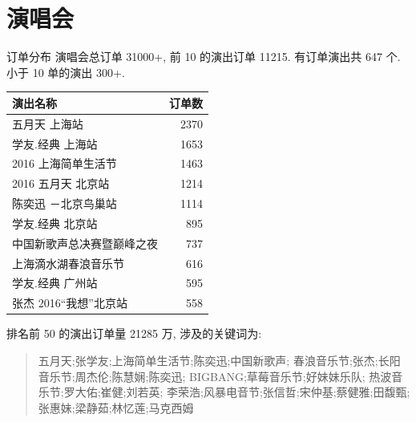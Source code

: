\documentclass[presentation, bigger]{beamer}
\begin{document}
\section{演唱会}
\label{sec:org31909c0}
\begin{frame}[allowframebreaks,label=]{订单分布}
演唱会总订单 31000+, 前 10 的演出订单 11215. 有订单演出共 647 个. 小于 10 单的演出 300+.
\begin{center}
\begin{tabular}{lr}
演出名称 & 订单数\\
\hline
五月天 上海站 & 2370\\
学友.经典 上海站 & 1653\\
2016 上海简单生活节 & 1463\\
2016 五月天 北京站 & 1214\\
陈奕迅 －北京鸟巢站 & 1114\\
学友.经典 北京站 & 895\\
中国新歌声总决赛暨巅峰之夜 & 737\\
上海滴水湖春浪音乐节 & 616\\
学友.经典 广州站 & 595\\
张杰 2016“我想”北京站 & 558\\
\end{tabular}
\end{center}

\framebreak
排名前 50 的演出订单量 21285 万, 涉及的关键词为:

\begin{quote}
五月天;张学友;上海简单生活节;陈奕迅;中国新歌声;
春浪音乐节;张杰;长阳音乐节;周杰伦;陈慧娴;陈奕迅;
BIGBANG;草莓音乐节;好妹妹乐队;
热波音乐节;罗大佑;崔健;刘若英;
李荣浩;风暴电音节;张信哲;宋仲基;蔡健雅;田馥甄;
张惠妹;梁静茹;林忆莲;马克西姆
\end{quote}
\end{frame}
\end{document}
